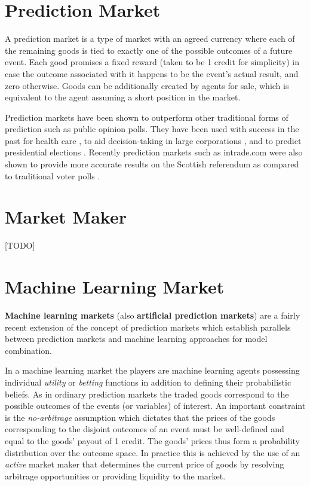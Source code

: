 \documentclass[bsc,frontabs,twoside,singlespacing,parskip,deptreport]{infthesis}     %
\begin{document}
\section{Prediction Market}

    A prediction market is a type of market with an agreed currency where each of the remaining goods is tied to exactly one of the possible outcomes of a future event. Each good promises a fixed reward (taken to be 1 credit for simplicity) in case the outcome associated with it happens to be the event's actual result, and zero otherwise. Goods can be additionally created by agents for sale, which is equivalent to the agent assuming a short position in the market. 
    
    Prediction markets have been shown to outperform other traditional forms of prediction such as public opinion polls. They have been used with success in the past for health care \cite{polgreen_use_2007}, to aid decision-taking in large corporations \cite{cowgill_using_2009}, and to predict presidential elections \cite{dudik_combinatorial_2013}. Recently prediction markets such as intrade.com were also shown to provide more accurate results on the Scottish referendum as compared to traditional voter polls \cite{bell_independence_2014}.

\section{Market Maker}
    [TODO]

\section{Machine Learning Market}
    {\bf Machine learning markets} (also {\bf artificial prediction markets}) are a fairly recent extension of the concept of prediction markets which establish parallels between prediction markets and machine learning approaches for model combination. 

In a machine learning market the players are machine learning agents possessing individual {\em utility} or {\em betting} functions in addition to defining their probabilistic beliefs. As in ordinary prediction markets the traded goods correspond to the possible outcomes of the events (or variables) of interest. An important constraint is the {\em no-arbitrage} assumption which dictates that the prices of the goods corresponding to the disjoint outcomes of an event must be well-defined and equal to the goods' payout of 1 credit. The goods' prices thus form a probability distribution over the outcome space. In practice this is achieved by the use of an {\em active} market maker that determines the current price of goods by resolving arbitrage opportunities or providing liquidity to the market. 
\end{document}
